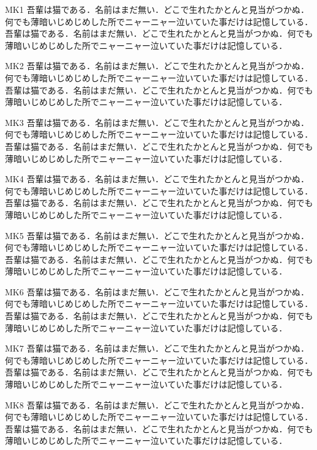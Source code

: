 \documentclass[fontsize=10pt,twocolumn]{jlreq}
\begin{document}
MK1 吾輩は猫である．名前はまだ無い．どこで生れたかとんと見当がつかぬ．何でも薄暗いじめじめした所でニャーニャー泣いていた事だけは記憶している． 吾輩は猫である．名前はまだ無い．どこで生れたかとんと見当がつかぬ．何でも薄暗いじめじめした所でニャーニャー泣いていた事だけは記憶している．\par
{}MK2 吾輩は猫である．名前はまだ無い．どこで生れたかとんと見当がつかぬ．何でも薄暗いじめじめした所でニャーニャー泣いていた事だけは記憶している． 吾輩は猫である．名前はまだ無い．どこで生れたかとんと見当がつかぬ．何でも薄暗いじめじめした所でニャーニャー泣いていた事だけは記憶している．\par
{}MK3 吾輩は猫である．名前はまだ無い．どこで生れたかとんと見当がつかぬ．何でも薄暗いじめじめした所でニャーニャー泣いていた事だけは記憶している． 吾輩は猫である．名前はまだ無い．どこで生れたかとんと見当がつかぬ．何でも薄暗いじめじめした所でニャーニャー泣いていた事だけは記憶している．\par
{}MK4 吾輩は猫である．名前はまだ無い．どこで生れたかとんと見当がつかぬ．何でも薄暗いじめじめした所でニャーニャー泣いていた事だけは記憶している． 吾輩は猫である．名前はまだ無い．どこで生れたかとんと見当がつかぬ．何でも薄暗いじめじめした所でニャーニャー泣いていた事だけは記憶している．\par
{}
MK5 吾輩は猫である．名前はまだ無い．どこで生れたかとんと見当がつかぬ．何でも薄暗いじめじめした所でニャーニャー泣いていた事だけは記憶している． 吾輩は猫である．名前はまだ無い．どこで生れたかとんと見当がつかぬ．何でも薄暗いじめじめした所でニャーニャー泣いていた事だけは記憶している．\par
{}MK6 吾輩は猫である．名前はまだ無い．どこで生れたかとんと見当がつかぬ．何でも薄暗いじめじめした所でニャーニャー泣いていた事だけは記憶している． 吾輩は猫である．名前はまだ無い．どこで生れたかとんと見当がつかぬ．何でも薄暗いじめじめした所でニャーニャー泣いていた事だけは記憶している．\par
{}MK7 吾輩は猫である．名前はまだ無い．どこで生れたかとんと見当がつかぬ．何でも薄暗いじめじめした所でニャーニャー泣いていた事だけは記憶している． 吾輩は猫である．名前はまだ無い．どこで生れたかとんと見当がつかぬ．何でも薄暗いじめじめした所でニャーニャー泣いていた事だけは記憶している．\par
{}MK8 吾輩は猫である．名前はまだ無い．どこで生れたかとんと見当がつかぬ．何でも薄暗いじめじめした所でニャーニャー泣いていた事だけは記憶している． 吾輩は猫である．名前はまだ無い．どこで生れたかとんと見当がつかぬ．何でも薄暗いじめじめした所でニャーニャー泣いていた事だけは記憶している．\par
\end{document}
